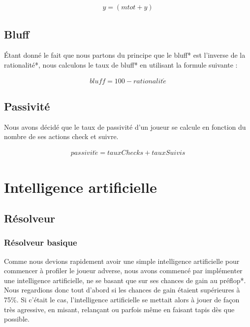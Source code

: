 \documentclass{report}
\begin{document}
\begin{align*}
	y=\left(mtot + y\right)
\end{align*}

\section{Bluff}

\hspace{0.5cm}Étant donné le fait que nous partons du principe que le bluff* est l'inverse de la rationalité*, nous calculons le taux de bluff* en utilisant la formule suivante : \par

\begin{align*}
	bluff=100-rationalit\acute{e}
\end{align*}


\section{Passivité}

\hspace{0.5cm}Nous avons décidé que le taux de passivité d'un joueur se calcule en fonction du nombre de ses actions check et suivre.\par
\begin{align*}
	passivit\acute{e}=tauxChecks+tauxSuivis
\end{align*}


\chapter{Intelligence artificielle}
\section{Résolveur}
\subsection{Résolveur basique}


\hspace{0.5cm}Comme nous devions rapidement avoir une simple intelligence artificielle pour commencer à profiler le joueur adverse, nous avons commencé par implémenter une intelligence artificielle, ne se basant que sur ses chances de gain au préflop*.\\

Nous regardions donc tout d'abord si les chances de gain étaient supérieures à 75\%. Si c'était le cas, l'intelligence artificielle se mettait alors à jouer de façon très agressive, en misant, relançant ou parfois même en faisant tapis dès que possible.\\
\end{document}
